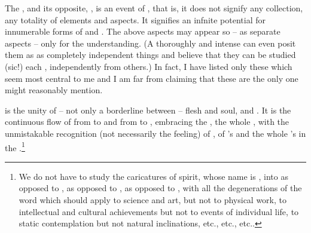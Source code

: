 The , and its opposite, , is
an event of , that is, it does not signify any
collection, any totality of elements and aspects.  It signifies an
infnite potential for innumerable forms of  and
.  The above aspects may appear so -- as separate
aspects -- only for the  understanding.  (A thoroughly
 and intense  can even posit them as as
completely independent things and believe that they can be studied 
(sic!) each
, independently from others.)  In fact, I have listed
only these which seem most central to me and I am far from claiming
that these are the only one might reasonably mention.




\pa
{} is the unity of -- not only a borderline between -- flesh
and soul,  and .  
It is the continuous flow of 
 from  to  and from  to 
, embracing the , the whole 
, with the unmistakable recognition (not necessarily the  
feeling) of , of 's and the whole 's  in the .\footnote{We 
do not have to study the caricatures of spirit, whose name is 
,  into  as opposed to 
,  as opposed to ,  
as opposed to , with all the degenerations of the word 
which should apply to science and art, but not to physical work, to 
intellectual and cultural achievements but not to events of individual 
life, to static contemplation but not natural inclinations, etc., etc., etc.. }

